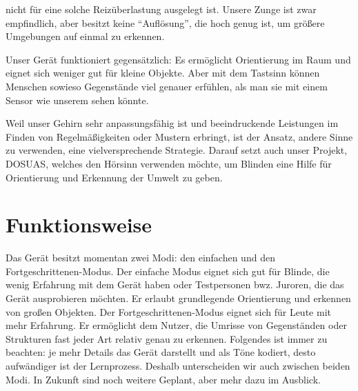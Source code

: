 \documentclass[a4paper,12pt,ngerman]{scrartcl}
\begin{document}
nicht für eine solche Reizüberlastung ausgelegt ist. Unsere Zunge ist zwar empfindlich, aber besitzt keine
\enquote{Auflösung}, die hoch genug ist, um größere Umgebungen auf einmal zu erkennen.\par 
Unser Gerät funktioniert gegensätzlich: Es ermöglicht 
Orientierung im Raum und eignet sich weniger gut für kleine Objekte. Aber mit dem Tastsinn können Menschen
sowieso Gegenstände viel genauer erfühlen, als man sie mit einem Sensor wie unserem sehen könnte.\par
Weil unser Gehirn sehr anpassungsfähig ist und beeindruckende
Leistungen im Finden von Regelmäßigkeiten oder Mustern erbringt, ist der Ansatz,
andere Sinne zu verwenden, eine vielversprechende Strategie. Darauf setzt auch 
unser Projekt, DOSUAS, welches den Hörsinn verwenden möchte, um Blinden eine Hilfe
für Orientierung und Erkennung der Umwelt zu geben.

\newpage

\section{Funktionsweise}

Das Gerät besitzt momentan zwei Modi: den einfachen und den Fortgeschrittenen-Modus. Der einfache Modus 
eignet sich gut für Blinde, die wenig Erfahrung mit dem Gerät haben oder Testpersonen bwz. Juroren, die das
Gerät ausprobieren möchten. Er erlaubt grundlegende Orientierung und erkennen von großen Objekten. Der
Fortgeschrittenen-Modus eignet sich für Leute mit mehr Erfahrung. Er ermöglicht dem Nutzer, die Umrisse von 
Gegenständen oder Strukturen fast jeder Art relativ genau zu erkennen. Folgendes ist immer zu beachten: 
je mehr Details das Gerät darstellt und als Töne kodiert, desto aufwändiger ist der Lernprozess. 
Deshalb unterscheiden wir auch zwischen beiden Modi. In Zukunft sind noch weitere Geplant, aber mehr dazu im 
Ausblick.
\end{document}
